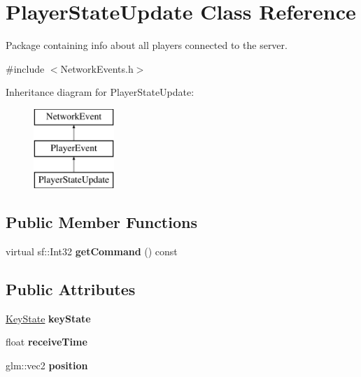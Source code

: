 \hypertarget{class_player_state_update}{\section{Player\-State\-Update Class Reference}
\label{class_player_state_update}
}


Package containing info about all players connected to the server.  




{\ttfamily \#include $<$Network\-Events.\-h$>$}

Inheritance diagram for Player\-State\-Update\-:\begin{figure}[H]
\begin{center}
\leavevmode
\includegraphics[height=3.000000cm]{class_player_state_update}
\end{center}
\end{figure}
\subsection*{Public Member Functions}
\begin{DoxyCompactItemize}
\item 
\hypertarget{class_player_state_update_abd83649334f18d98f0ead15689f59a57}{virtual sf\-::\-Int32 {\bfseries get\-Command} () const }\label{class_player_state_update_abd83649334f18d98f0ead15689f59a57}

\end{DoxyCompactItemize}
\subsection*{Public Attributes}
\begin{DoxyCompactItemize}
\item 
\hypertarget{class_player_state_update_a4711991bf997f3fe2c5076f2151fe9ba}{\hyperlink{class_key_state}{Key\-State} {\bfseries key\-State}}\label{class_player_state_update_a4711991bf997f3fe2c5076f2151fe9ba}

\item 
\hypertarget{class_player_state_update_a62c4352fcc8469da9b498065d1e024d9}{float {\bfseries receive\-Time}}\label{class_player_state_update_a62c4352fcc8469da9b498065d1e024d9}

\item 
\hypertarget{class_player_state_update_a78f5ddfeaa3e94a0ef7b1d98a0c96084}{glm\-::vec2 {\bfseries position}}\label{class_player_state_update_a78f5ddfeaa3e94a0ef7b1d98a0c96084}

\end{DoxyCompactItemize}
